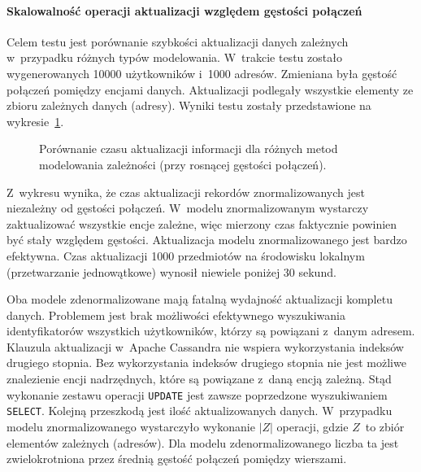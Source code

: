 \paragraph{Skalowalność operacji aktualizacji względem gęstości połączeń} 

Celem testu jest porównanie szybkości aktualizacji danych zależnych w~przypadku różnych typów modelowania. W~trakcie testu zostało wygenerowanych 10000 użytkowników i~1000 adresów. Zmieniana była gęstość połączeń pomiędzy encjami danych. Aktualizacji podlegały wszystkie elementy ze zbioru zależnych danych (adresy). Wyniki testu zostały przedstawione na wykresie~\ref{fig:update_time_relation_density_comparison}.

\begin{figure}[ht!]
	\centering

	\caption{Porównanie czasu aktualizacji informacji dla różnych metod modelowania zależności (przy rosnącej gęstości połączeń).}
	\label{fig:update_time_relation_density_comparison}
\end{figure}

Z~wykresu wynika, że czas aktualizacji rekordów znormalizowanych jest niezależny od gęstości połączeń. W~modelu znormalizowanym wystarczy zaktualizować wszystkie encje zależne, więc mierzony czas faktycznie powinien być stały względem gęstości. Aktualizacja modelu znormalizowanego jest bardzo efektywna. Czas aktualizacji 1000 przedmiotów na środowisku lokalnym (przetwarzanie jednowątkowe) wynosił niewiele poniżej 30 sekund. 

Oba modele zdenormalizowane mają fatalną wydajność aktualizacji kompletu danych. Problemem jest brak możliwości efektywnego wyszukiwania identyfikatorów wszystkich użytkowników, którzy są powiązani z~danym adresem. Klauzula aktualizacji w~Apache Cassandra nie wspiera wykorzystania indeksów drugiego stopnia. Bez wykorzystania indeksów drugiego stopnia nie jest możliwe znalezienie encji nadrzędnych, które są powiązane z~daną encją zależną. Stąd wykonanie zestawu operacji \verb+UPDATE+ jest zawsze poprzedzone wyszukiwaniem \verb+SELECT+. Kolejną przeszkodą jest ilość aktualizowanych danych. W~przypadku modelu znormalizowanego wystarczyło wykonanie $|Z|$ operacji, gdzie $Z$~to zbiór elementów zależnych (adresów). Dla modelu zdenormalizowanego liczba ta jest zwielokrotniona przez średnią gęstość połączeń pomiędzy wierszami.

